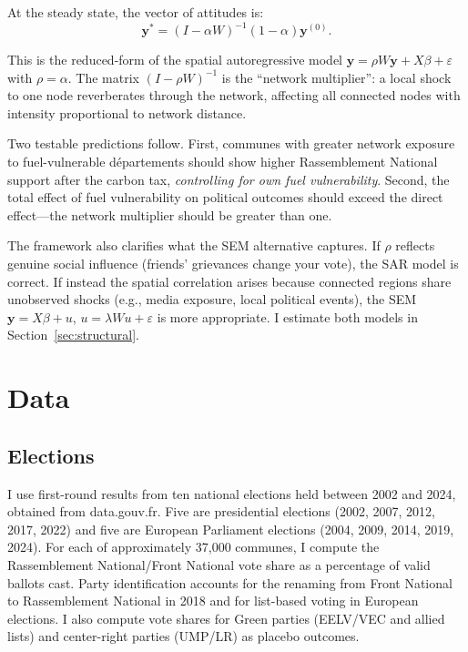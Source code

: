 \documentclass[12pt]{article}
\newcommand{\rn}{Rassemblement National}
\newcommand{\fn}{Front National}
\newcommand{\depts}{d\'{e}partements}
\begin{document}
At the steady state, the vector of attitudes is:
\begin{equation}
\mathbf{y}^* = (I - \alpha W)^{-1} (1-\alpha) \mathbf{y}^{(0)}.
\label{eq:steady_state}
\end{equation}

This is the reduced-form of the spatial autoregressive model $\mathbf{y} = \rho W \mathbf{y} + X\beta + \varepsilon$ with $\rho = \alpha$. The matrix $(I - \rho W)^{-1}$ is the ``network multiplier'': a local shock to one node reverberates through the network, affecting all connected nodes with intensity proportional to network distance.

Two testable predictions follow. First, communes with greater network exposure to fuel-vulnerable \depts{} should show higher \rn{} support after the carbon tax, \emph{controlling for own fuel vulnerability}. Second, the total effect of fuel vulnerability on political outcomes should exceed the direct effect---the network multiplier should be greater than one.

The framework also clarifies what the SEM alternative captures. If $\rho$ reflects genuine social influence (friends' grievances change your vote), the SAR model is correct. If instead the spatial correlation arises because connected regions share unobserved shocks (e.g., media exposure, local political events), the SEM $\mathbf{y} = X\beta + u$, $u = \lambda W u + \varepsilon$ is more appropriate. I estimate both models in Section~\ref{sec:structural}.



\section{Data}
\label{sec:data}

\subsection{Elections}

I use first-round results from ten national elections held between 2002 and 2024, obtained from data.gouv.fr. Five are presidential elections (2002, 2007, 2012, 2017, 2022) and five are European Parliament elections (2004, 2009, 2014, 2019, 2024). For each of approximately 37,000 communes, I compute the \rn{}/\fn{} vote share as a percentage of valid ballots cast. Party identification accounts for the renaming from \fn{} to \rn{} in 2018 and for list-based voting in European elections. I also compute vote shares for Green parties (EELV/VEC and allied lists) and center-right parties (UMP/LR) as placebo outcomes.
\end{document}
